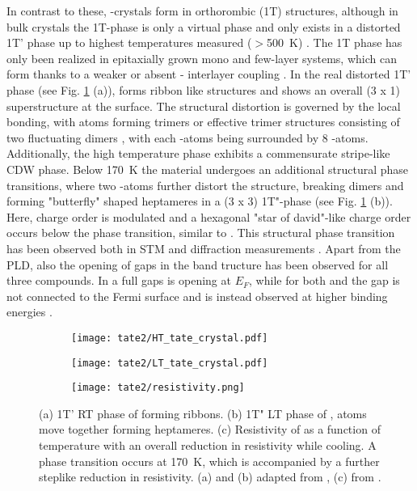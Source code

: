 In contrast to these, -crystals form in orthorombic (1T) structures, although in bulk crystals the 1T-phase is only a virtual phase and only exists in a distorted 1T' phase up to highest temperatures measured ($>$\qty{500}{\kelvin}) \cite{petkov_exotic_2020}.
The 1T phase has only been realized in epitaxially grown mono and few-layer systems, which can form thanks to a weaker or absent - interlayer coupling \cite{hwang_novel_2022, wang_polymorphic_2024}.
In the real distorted 1T' phase (see Fig. \ref{fig:tate_structure} (a)),  forms ribbon like structures and shows an overall (3 x 1) superstructure at the surface.
The structural distortion is governed by the local bonding, with  atoms forming trimers or effective trimer structures consisting of two fluctuating dimers \cite{katayama_observation_2023}, with each -atoms being surrounded by 8 -atoms.
Additionally, the high temperature phase exhibits a commensurate stripe-like CDW phase.
Below \qty{170}{\kelvin} the material undergoes an additional structural phase transitions, where two -atoms further distort the structure, breaking dimers and forming "butterfly" shaped heptameres in a (3 x 3) 1T"-phase \cite{feng_charge_2016, katayama_observation_2023} (see Fig. \ref{fig:tate_structure} (b)).
Here, charge order is modulated and a hexagonal "star of david"-like charge order occurs below the phase transition, similar to .
This structural phase transition has been observed both in STM and diffraction measurements \cite{feng_charge_2016, siddiqui_ultrafast_2021, domrose_femtosecond_2024}.
Apart from the PLD, also the opening of gaps in the band tructure has been observed for all three compounds.
In  a full gaps is opening at $E_F$, while for both  and  the gap is not connected to the Fermi surface and is instead observed at higher binding energies \cite{lin_evidence_2022, mitsuishi_unveiling_2024}.

\begin{figure}
	\centering
	\begin{subfigure}[b]{0.3\textwidth}
		\texttt{[image: tate2/HT\_tate\_crystal.pdf]}
		\caption{}
	\end{subfigure}
	\hfill
	\begin{subfigure}[b]{0.3\textwidth}
		\texttt{[image: tate2/LT\_tate\_crystal.pdf]}
		\caption{}
	\end{subfigure}
	\hfill
	\begin{subfigure}[b]{0.3\textwidth}
		\texttt{[image: tate2/resistivity.png]}
		\caption{}
	\end{subfigure}
	\caption{(a) 1T' RT phase of  forming ribbons. (b) 1T" LT phase of ,  atoms move together forming heptameres. (c) Resistivity of  as a function of temperature with an overall reduction in resistivity while cooling. A phase transition occurs at \qty{170}{\kelvin}, which is accompanied by a further steplike reduction in resistivity. (a) and (b) adapted from \cite{lin_evidence_2022}, (c) from \cite{hu_optical_2022}.}
	\label{fig:tate_structure}
\end{figure}

